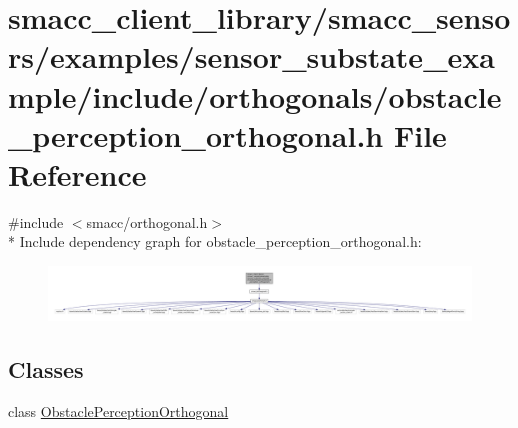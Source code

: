 \hypertarget{smacc__client__library_2smacc__sensors_2examples_2sensor__substate__example_2include_2orthogonala707cfaad3235c00883bb2c73667eac3}{}\section{smacc\+\_\+client\+\_\+library/smacc\+\_\+sensors/examples/sensor\+\_\+substate\+\_\+example/include/orthogonals/obstacle\+\_\+perception\+\_\+orthogonal.h File Reference}
\label{smacc__client__library_2smacc__sensors_2examples_2sensor__substate__example_2include_2orthogonala707cfaad3235c00883bb2c73667eac3}
{\ttfamily \#include $<$smacc/orthogonal.\+h$>$}\\*
Include dependency graph for obstacle\+\_\+perception\+\_\+orthogonal.\+h\+:
\nopagebreak
\begin{figure}[H]
\begin{center}
\leavevmode
\includegraphics[width=350pt]{smacc__client__library_2smacc__sensors_2examples_2sensor__substate__example_2include_2orthogonalad58a0cf1488b5bfdaeca7cb81c372af}
\end{center}
\end{figure}
\subsection*{Classes}
\begin{DoxyCompactItemize}
\item 
class \hyperlink{classObstaclePerceptionOrthogonal}{Obstacle\+Perception\+Orthogonal}
\end{DoxyCompactItemize}
